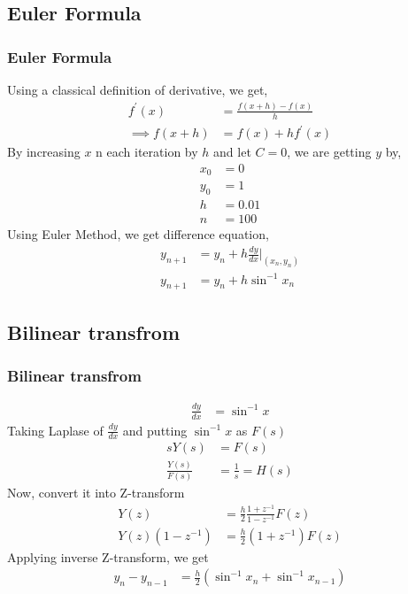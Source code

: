 \documentclass{beamer}
\providecommand{\brak}[1]{\ensuremath{\left(#1\right)}}
\theoremstyle{remark}
\numberwithin{equation}{section}
\begin{document}
\subsection{Euler Formula}
\begin{frame}
\frametitle{Euler Formula}

Using a classical definition of derivative, we get,\\
\begin{align}
    f^{\prime}\brak{x} &= \frac{f\brak{x+h}-f\brak{x}}{h}\\
    \implies f\brak{x+h} &= f\brak{x} + h f^{\prime}\brak{x}
\end{align}
By increasing $x$ n each iteration by $h$ and let $C=0$, we are getting $y$ by,
\begin{align}
x_0 &= 0\\
y_0 &= 1\\
h &= 0.01\\
n &= 100
\end{align}
Using Euler Method, we get difference equation,
\begin{align}
y_{n+1} &= y_n + h\frac{dy}{dx}\Big|_{\brak{x_n,y_n}}\\
y_{n+1} &= y_n + h\sin^{-1}{x_n}
\end{align}


\end{frame}

\subsection{Bilinear transfrom}
\begin{frame}
\frametitle{Bilinear transfrom}

\begin{align}
    \frac{dy}{dx} &= \sin^{-1}{x}
\end{align}
Taking Laplase of $\frac{dy}{dx}$ and putting $\sin^{-1}{x}$ as $F\brak{s}$
\begin{align}
    sY\brak{s}&=F\brak{s}\\
    \frac{Y\brak{s}}{F\brak{s}}&=\frac{1}{s}=H\brak{s}
\end{align}
Now, convert it into Z-transform
\begin{align}
    Y\brak{z}&=\frac{h}{2}\frac{1+z^{-1}}{1-z^{-1}}F\brak{z}\\
    Y\brak{z}\brak{1-z^{-1}}&=\frac{h}{2}\brak{1+z^{-1}}F\brak{z}
\end{align}
Applying inverse Z-transform, we get
\begin{align}
    y_{n}-y_{n-1}&=\frac{h}{2}\brak{\sin^{-1}{x_n}+\sin^{-1}{x_{n-1}}}
\end{align}

\end{frame}
\end{document}
